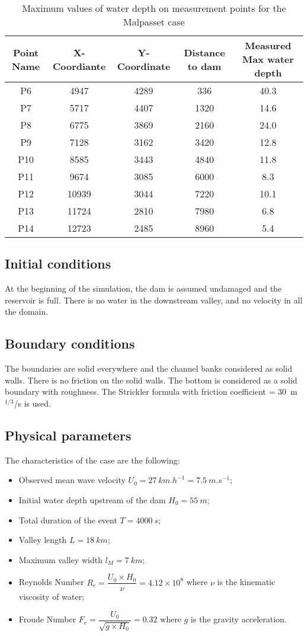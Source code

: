 \begin{table}[H]
  \centering
  \begin{tabular}{|c|c|c|c|c|}
    \hline Point Name & X-Coordiante & Y-Coordinate & Distance to dam & Measured Max water depth \\
    \hline P6 & 4947 & 4289 & 336 & 40.3\\
    P7 & 5717 & 4407 & 1320 & 14.6\\
    P8 & 6775 & 3869 & 2160 & 24.0\\
    P9 & 7128 & 3162 & 3420 & 12.8\\
    P10 & 8585 & 3443 & 4840 & 11.8 \\
    P11 & 9674 & 3085 & 6000 & 8.3\\
    P12 & 10939 & 3044 & 7220 & 10.1\\
    P13 & 11724 & 2810 & 7980 & 6.8 \\
    P14 & 12723 & 2485 & 8960 & 5.4\\
    \hline
  \end{tabular}
  \caption{Maximum values of water depth on measurement points for the Malpasset case}
  \label{tab:malpasset:MaxMeasures}
\end{table}

\subsection{Initial conditions}
At the beginning of the simulation, the dam is assumed undamaged and the reservoir is full. There is no water in the downstream valley, and no velocity in all the domain.
\subsection{Boundary conditions}
The boundaries are solid everywhere and the channel banks considered as solid walls. There is no friction on the solid walls. The bottom is considered as a solid boundary with roughness. The Strickler formula with friction coefficient = 30~m$^{1/3}$/s is used.

\subsection{Physical parameters}

The characteristics of the case are the following:
\begin{itemize}
  \itemsep0em
\item Observed mean wave velocity $U_0 = 27~km.h^{-1} = 7.5~m.s^{-1}$;
\item Initial water depth upstream of the dam $H_0 = 55~m$;
\item Total duration of the event $T = 4000~s$;
\item Valley length $L = 18~km$;
\item Maximum valley width $l_M = 7~km$;
\item Reynolds Number \textbf{$R_e = \dfrac{U_0 \times H_0}{\nu} =  4.12 \times 10^8$} where $\nu$ is the kinematic viscosity of water;
\item Froude Number \textbf{$F_r = \dfrac{U_0}{\sqrt{g \times H_0}} = 0.32$} where $g$ is the gravity acceleration.
\end{itemize}

